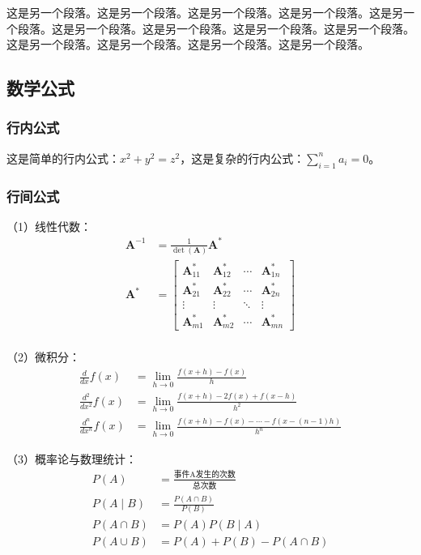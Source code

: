 \documentclass[UTF8, zihao = -4, linespread = 1.335, heading = true, fontset = fandol]{ctexart}
\begin{document}
这是另一个段落。这是另一个段落。这是另一个段落。这是另一个段落。这是另一个段落。这是另一个段落。这是另一个段落。这是另一个段落。这是另一个段落。这是另一个段落。这是另一个段落。这是另一个段落。这是另一个段落。
\subsection{数学公式}
\subsubsection{行内公式}
这是简单的行内公式：$x^2+y^2=z^2$，这是复杂的行内公式：$\sum_{i=1}^n a_i=0$。
\subsubsection{行间公式}
（1）线性代数：
\begin{equation}
    \begin{split}
        \mathbf{A}^{-1} &= \frac{1}{\det(\mathbf{A})}\mathbf{A}^* \\
        \mathbf{A}^* &= \begin{bmatrix}
            \mathbf{A}_{11}^* & \mathbf{A}_{12}^* & \cdots & \mathbf{A}_{1n}^* \\
            \mathbf{A}_{21}^* & \mathbf{A}_{22}^* & \cdots & \mathbf{A}_{2n}^* \\
            \vdots & \vdots & \ddots & \vdots \\
            \mathbf{A}_{m1}^* & \mathbf{A}_{m2}^* & \cdots & \mathbf{A}_{mn}^*
        \end{bmatrix} \\
    \end{split}
\end{equation}

（2）微积分：
\begin{equation}
    \begin{split}
        \frac{d}{dx}f(x) &= \lim_{h \to 0}\frac{f(x+h)-f(x)}{h} \\
        \frac{d^2}{dx^2}f(x) &= \lim_{h \to 0}\frac{f(x+h)-2f(x)+f(x-h)}{h^2} \\
        \frac{d^n}{dx^n}f(x) &= \lim_{h \to 0}\frac{f(x+h)-f(x)-\cdots-f(x-(n-1)h)}{h^n}
    \end{split}
    \label{eq:2}
\end{equation}

（3）概率论与数理统计：
\begin{equation}
    \begin{split}
        P(A) &= \frac{\text{事件A发生的次数}}{\text{总次数}} \\
        P(A \mid B) &= \frac{P(A \cap B)}{P(B)} \\
        P(A \cap B) &= P(A)P(B \mid A) \\
        P(A \cup B) &= P(A) + P(B) - P(A \cap B)
    \end{split}
\end{equation}
\end{document}
